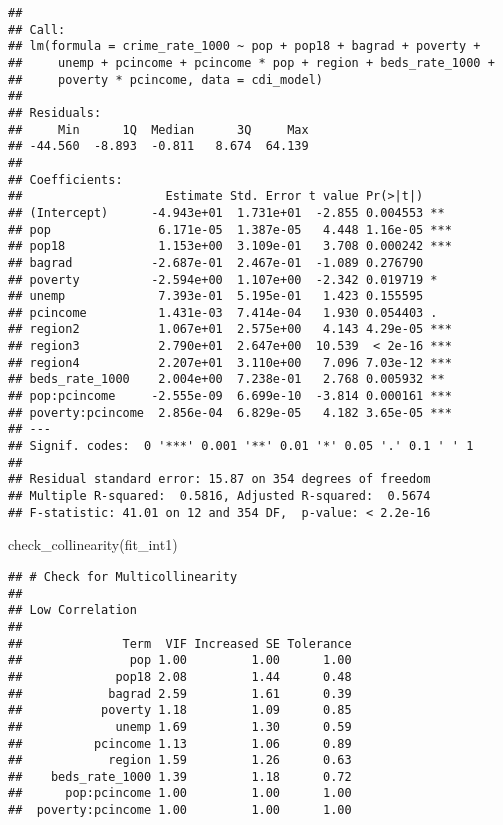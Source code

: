 \documentclass[
  11pt,
]{article}
\newenvironment{Shaded}{\begin{snugshade}}{\end{snugshade}}
\newcommand{\FunctionTok}[1]{\textcolor[rgb]{0.00,0.00,0.00}{#1}}
\newcommand{\NormalTok}[1]{#1}
\begin{document}
\begin{verbatim}
## 
## Call:
## lm(formula = crime_rate_1000 ~ pop + pop18 + bagrad + poverty + 
##     unemp + pcincome + pcincome * pop + region + beds_rate_1000 + 
##     poverty * pcincome, data = cdi_model)
## 
## Residuals:
##     Min      1Q  Median      3Q     Max 
## -44.560  -8.893  -0.811   8.674  64.139 
## 
## Coefficients:
##                    Estimate Std. Error t value Pr(>|t|)    
## (Intercept)      -4.943e+01  1.731e+01  -2.855 0.004553 ** 
## pop               6.171e-05  1.387e-05   4.448 1.16e-05 ***
## pop18             1.153e+00  3.109e-01   3.708 0.000242 ***
## bagrad           -2.687e-01  2.467e-01  -1.089 0.276790    
## poverty          -2.594e+00  1.107e+00  -2.342 0.019719 *  
## unemp             7.393e-01  5.195e-01   1.423 0.155595    
## pcincome          1.431e-03  7.414e-04   1.930 0.054403 .  
## region2           1.067e+01  2.575e+00   4.143 4.29e-05 ***
## region3           2.790e+01  2.647e+00  10.539  < 2e-16 ***
## region4           2.207e+01  3.110e+00   7.096 7.03e-12 ***
## beds_rate_1000    2.004e+00  7.238e-01   2.768 0.005932 ** 
## pop:pcincome     -2.555e-09  6.699e-10  -3.814 0.000161 ***
## poverty:pcincome  2.856e-04  6.829e-05   4.182 3.65e-05 ***
## ---
## Signif. codes:  0 '***' 0.001 '**' 0.01 '*' 0.05 '.' 0.1 ' ' 1
## 
## Residual standard error: 15.87 on 354 degrees of freedom
## Multiple R-squared:  0.5816, Adjusted R-squared:  0.5674 
## F-statistic: 41.01 on 12 and 354 DF,  p-value: < 2.2e-16
\end{verbatim}

\begin{Shaded}
\begin{Highlighting}[]
\FunctionTok{check\_collinearity}\NormalTok{(fit\_int1)}
\end{Highlighting}
\end{Shaded}

\begin{verbatim}
## # Check for Multicollinearity
## 
## Low Correlation
## 
##              Term  VIF Increased SE Tolerance
##               pop 1.00         1.00      1.00
##             pop18 2.08         1.44      0.48
##            bagrad 2.59         1.61      0.39
##           poverty 1.18         1.09      0.85
##             unemp 1.69         1.30      0.59
##          pcincome 1.13         1.06      0.89
##            region 1.59         1.26      0.63
##    beds_rate_1000 1.39         1.18      0.72
##      pop:pcincome 1.00         1.00      1.00
##  poverty:pcincome 1.00         1.00      1.00
\end{verbatim}
\end{document}
